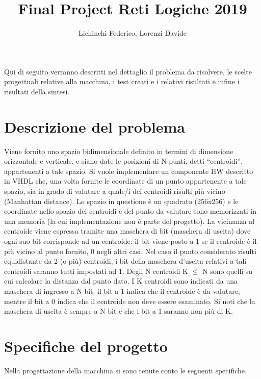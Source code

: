 \documentclass[a4paper,12pt]{article}
\title{Final Project Reti Logiche 2019}
\author{Lichinchi Federico, Lorenzi Davide}
\begin{document}
\maketitle
\newpage
\tableofcontents
\newpage

Qui di seguito verranno descritti nel dettaglio il problema da risolvere, le scelte progettuali relative alla macchina, i test creati e i relativi risultati e infine i risultati della sintesi.

\section{Descrizione del problema}
Viene fornito uno spazio bidimensionale definito in termini di dimensione orizzontale e verticale, e siano date le posizioni di N punti, detti “centroidi”, appartenenti a tale spazio. Si vuole implementare un componente HW descritto in VHDL che, una volta fornite le coordinate di un punto appartenente a tale spazio, sia in grado di valutare a quale/i dei centroidi risulti più vicino (Manhattan distance).
Lo spazio in questione è un quadrato (256x256) e le coordinate nello spazio dei centroidi e del punto da valutare sono memorizzati in una memoria (la cui implementazione non è parte del progetto). La vicinanza al centroide viene espressa tramite una maschera di bit (maschera di uscita) dove ogni suo bit corrisponde ad un centroide: il bit viene posto a 1 se il centroide è il più vicino al punto fornito, 0 negli altri casi. Nel caso il punto considerato risulti equidistante da 2 (o più) centroidi, i bit della maschera d’uscita relativi a tali centroidi saranno tutti impostati ad 1.
Degli N centroidi K $\leq$ N sono quelli su cui calcolare la distanza dal punto dato. I K centroidi sono indicati da una maschera di ingresso a N bit: il bit a 1 indica che il centroide è da valutare, mentre il bit a 0 indica che il centroide non deve essere esaminato. Si noti che la maschera di uscita è sempre a N bit e che i bit a 1 saranno non più di K.

\section{Specifiche del progetto}
Nella progettazione della macchina si sono tenute conto le seguenti specifiche.
\end{document}
